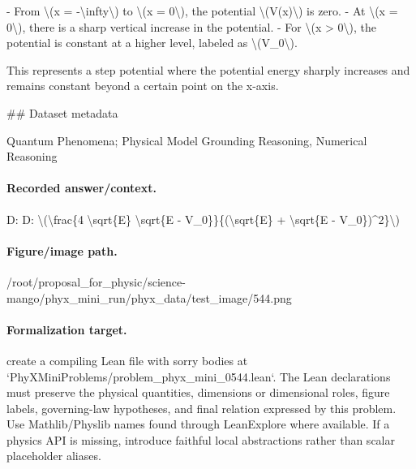 - From \textbackslash{}(x = -\textbackslash{}infty\textbackslash{}) to \textbackslash{}(x = 0\textbackslash{}), the potential \textbackslash{}(V(x)\textbackslash{}) is zero.
- At \textbackslash{}(x = 0\textbackslash{}), there is a sharp vertical increase in the potential.
- For \textbackslash{}(x > 0\textbackslash{}), the potential is constant at a higher level, labeled as \textbackslash{}(V\_0\textbackslash{}).

This represents a step potential where the potential energy sharply increases and remains constant beyond a certain point on the x-axis.

\#\# Dataset metadata

Quantum Phenomena; Physical Model Grounding Reasoning, Numerical Reasoning

\paragraph{Recorded answer/context.}
D: D: \textbackslash{}(\textbackslash{}frac\{4 \textbackslash{}sqrt\{E\} \textbackslash{}sqrt\{E - V\_0\}\}\{(\textbackslash{}sqrt\{E\} + \textbackslash{}sqrt\{E - V\_0\})\textasciicircum{}2\}\textbackslash{})

\paragraph{Figure/image path.}
/root/proposal\_for\_physic/science-mango/phyx\_mini\_run/phyx\_data/test\_image/544.png

\paragraph{Formalization target.}
create a compiling Lean file with sorry bodies at `PhyXMiniProblems/problem\_phyx\_mini\_0544.lean`. The Lean declarations must preserve the physical quantities, dimensions or dimensional roles, figure labels, governing-law hypotheses, and final relation expressed by this problem.
Use Mathlib/Physlib names found through LeanExplore where available. If a physics API is missing, introduce faithful local abstractions rather than scalar placeholder aliases.


